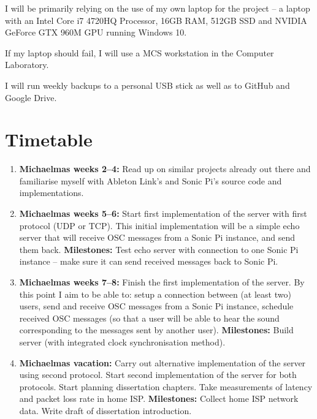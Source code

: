 \documentclass[12pt,a4paper,twoside]{article}
\begin{document}
I will be primarily relying on the use of my own laptop for the project -- a laptop with an Intel Core i7 4720HQ Processor, 16GB RAM, 512GB SSD and NVIDIA GeForce GTX 960M GPU running Windows 10.

If my laptop should fail, I will use a MCS workstation in the Computer Laboratory.

I will run weekly backups to a personal USB stick as well as to GitHub and Google Drive.

\newpage
\section*{Timetable}


\begin{enumerate}

\item \textbf{Michaelmas weeks 2--4:} Read up on similar projects already out there and familiarise myself with Ableton Link's and Sonic Pi's source code and implementations.

\item \textbf{Michaelmas weeks 5--6:} Start first implementation of the server with first protocol (UDP or TCP). This initial implementation will be a simple echo server that will receive OSC messages from a Sonic Pi instance, and send them back.
\newline\textbf{Milestones:} Test echo server with connection to one Sonic Pi instance -- make sure it can send received messages back to Sonic Pi.

\item \textbf{Michaelmas weeks 7--8:} Finish the first implementation of the server. By this point I aim to be able to: setup a connection between (at least two) users, send and receive OSC messages from a Sonic Pi instance, schedule received OSC messages (so that a user will be able to hear the sound corresponding to the messages sent by another user).
\newline\textbf{Milestones:} Build server (with integrated clock synchronisation method).

\item \textbf{Michaelmas vacation:} Carry out alternative implementation of the server using second protocol. Start second implementation of the server for both protocols. Start planning dissertation chapters. Take measurements of latency and packet loss rate in home ISP.
\newline\textbf{Milestones:} Collect home ISP network data. Write draft of dissertation introduction.


\end{enumerate}
\end{document}
